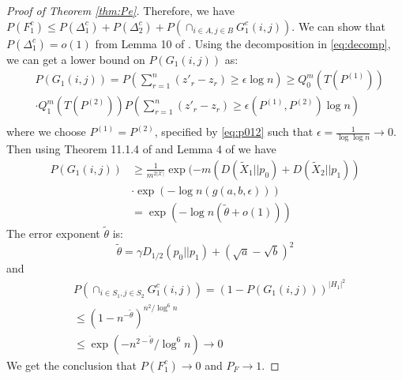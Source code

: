 \documentclass[conference]{IEEEtran}
\begin{document}
\begin{proof}[Proof of Theorem \ref{thm:Pe}]
Therefore, we have $P(F_1^c) \leq P(\Delta_1^c) + P(\Delta_2^c) + P(\cap_{i\in A, j\in B}G^c_1(i,j))$.
We can show that $P(\Delta_1^c) = o(1)$ from Lemma 10 of \cite{abbe2015exact}.
Using the decomposition in \eqref{eq:decomp}, we can get a lower bound on $P(G_1(i,j))$ as:
\begin{align*}
&P(G_1(i,j)) = P(\sum_{r=1}^{n} (z'_r - z_r) \geq  \epsilon \log n) \geq Q^m_0 (T(P^{(1)}))\\
& \cdot Q^m_1 (T(P^{(2)})) 
 P(\sum_{r=1}^{n} (z'_r - z_r) \geq \epsilon(P^{(1)}, P^{(2)}) \log n) \\
\end{align*}
where we choose $P^{(1)}=P^{(2)}$, specified by \eqref{eq:p012} such that $\epsilon=\frac{1}{\log \log n} \to 0$.
Then using Theorem 11.1.4 of \cite{cover1999elements} and Lemma 4 of \cite{abbe2015exact} we have
\begin{align*}
P(G_1(i,j))& \geq \frac{1}{m^{2|\mathcal{X}|}} \exp(-m(D(\widetilde{X}_1 || p_0) + D(\widetilde{X}_2 || p_1)) \\
&\cdot\exp(- \log n (g(a, b, \epsilon))) \\
& = \exp(-\log n (\tilde{\theta} + o(1)))
\end{align*}
The error exponent $\tilde{\theta}$
is:
\begin{equation*}
\tilde{\theta} = \gamma D_{1/2}(p_0||p_1) + (\sqrt{a} - \sqrt{b})^2
\end{equation*}
and 
\begin{align*}
& P(\cap_{i\in S_1, j\in S_2} G^c_1(i,j)) = (1 - P(G_1(i,j)))^{|H_1|^2} \\
& \leq (1-n^{-\tilde{\theta}})^{n^2/\log^6 n} \\
& \leq \exp(-n^{2 - \tilde{\theta}}/\log^6 n) \to 0
\end{align*}
We get the conclusion that $P(F_1^c) \to 0$ and $P_F \to 1$.

\end{proof}




\end{document}
